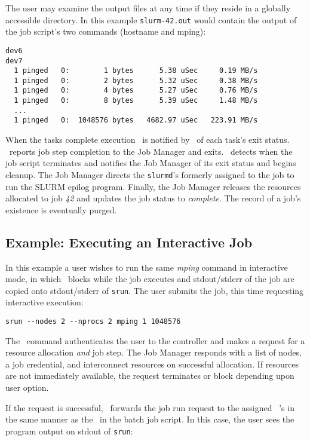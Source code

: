 The user may examine the output files at any time if they reside 
in a globally accessible directory. In this example
{\tt slurm-42.out} would  contain the output of the job script's two 
commands (hostname and mping):

\begin{verbatim}
dev6
dev7
  1 pinged   0:        1 bytes      5.38 uSec     0.19 MB/s                     
  1 pinged   0:        2 bytes      5.32 uSec     0.38 MB/s                     
  1 pinged   0:        4 bytes      5.27 uSec     0.76 MB/s                     
  1 pinged   0:        8 bytes      5.39 uSec     1.48 MB/s                     
  ...
  1 pinged   0:  1048576 bytes   4682.97 uSec   223.91 MB/s              
\end{verbatim}

When the tasks complete execution \srun\ is notified by \slurmd\ of each
task's exit status. \srun\ reports job step completion to the Job Manager
and exits. 
\slurmd\ detects when the job script terminates and notifies
the Job Manager of its exit status and begins cleanup. 
The Job Manager directs the {\tt slurmd}'s formerly assigned to the
job to run the SLURM epilog program. 
Finally, the Job Manager releases the resources allocated to job {\em 42}
and updates the job status to {\em complete}. The record of a job's
existence is eventually purged.

\subsection{Example:  Executing an Interactive Job}

In this example a user wishes to run the same {\em mping} command 
in interactive mode, in which \srun\ blocks while the job executes 
and stdout/stderr of the job are copied onto stdout/stderr of {\tt srun}.
The user submits the job, this time requesting interactive execution:
\begin{verbatim}
srun --nodes 2 --nprocs 2 mping 1 1048576
\end{verbatim}

The \srun\ command authenticates the user to the controller and
makes a request for a resource allocation {\em and} job step. The Job Manager
responds with a list of nodes, a job credential, and interconnect
resources on successful allocation. If resources are not immediately
available, the request terminates or block depending upon user
option.

If the request is successful, \srun\ forwards the job run request
to the assigned \slurmd~'s in the same manner as the \srun\ in the
batch job script. In this case, the user sees the program output on 
stdout of {\tt srun}:

